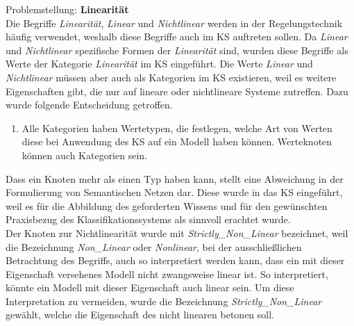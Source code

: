 Problemstellung: \textbf{Linearität}\\
Die Begriffe \textit{Linearität}, \textit{Linear} und \textit{Nichtlinear} werden in der Regelungstechnik häufig verwendet, weshalb diese Begriffe auch im KS auftreten sollen. Da \textit{Linear} und \textit{Nichtlinear} spezifische Formen der \textit{Linearität} sind, wurden diese Begriffe als Werte der Kategorie \textit{Linearität} im KS eingeführt. Die Werte \textit{Linear} und \textit{Nichtlinear} müssen aber auch als Kategorien im KS existieren, weil es weitere Eigenschaften gibt, die nur auf lineare oder nichtlineare Systeme zutreffen. Dazu wurde folgende Entscheidung getroffen.
\begin{enumerate}[resume*]
	\item \label{E.KS_Werteknoten}Alle Kategorien haben Wertetypen, die festlegen, welche Art von Werten diese bei Anwendung des KS auf ein Modell haben können. Werteknoten können auch Kategorien sein.
\end{enumerate}
Dass ein Knoten mehr als einen Typ haben kann, stellt eine Abweichung in der Formulierung von Semantischen Netzen dar. Diese wurde in das KS eingeführt, weil es für die Abbildung des geforderten Wissens und für den gewünschten Praxisbezug des Klassifikationssystems als sinnvoll erachtet wurde.\\
Der Knoten zur Nichtlinearität wurde mit \textit{Strictly\_Non\_Linear} bezeichnet, weil die Bezeichnung \textit{Non\_Linear} oder \textit{Nonlinear}, bei der ausschließlichen Betrachtung des Begriffs, auch so interpretiert werden kann, dass ein mit dieser Eigenschaft versehenes Modell nicht zwangsweise linear ist. So interpretiert, könnte ein Modell mit dieser Eigenschaft auch linear sein. Um diese Interpretation zu vermeiden, wurde die Bezeichnung \textit{Strictly\_Non\_Linear} gewählt, welche die Eigenschaft des nicht linearen betonen soll.\\ 

